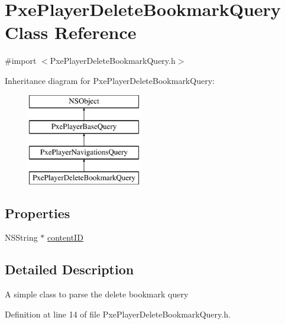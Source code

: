 \hypertarget{interface_pxe_player_delete_bookmark_query}{\section{Pxe\-Player\-Delete\-Bookmark\-Query Class Reference}
\label{interface_pxe_player_delete_bookmark_query}
}


{\ttfamily \#import $<$Pxe\-Player\-Delete\-Bookmark\-Query.\-h$>$}

Inheritance diagram for Pxe\-Player\-Delete\-Bookmark\-Query\-:\begin{figure}[H]
\begin{center}
\leavevmode
\includegraphics[height=4.000000cm]{interface_pxe_player_delete_bookmark_query}
\end{center}
\end{figure}
\subsection*{Properties}
\begin{DoxyCompactItemize}
\item 
N\-S\-String $\ast$ \hyperlink{interface_pxe_player_delete_bookmark_query_a135e067fd8555137353f7422b95eaabb}{content\-I\-D}
\end{DoxyCompactItemize}


\subsection{Detailed Description}
A simple class to parse the delete bookmark query 

Definition at line 14 of file Pxe\-Player\-Delete\-Bookmark\-Query.\-h.



